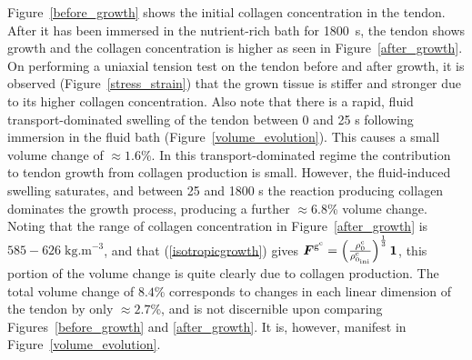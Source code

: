 Figure~\ref{before_growth} shows the initial collagen concentration in
the tendon. After it has been immersed in the nutrient-rich bath for
1800~s, the tendon shows growth and the collagen concentration is
higher as seen in Figure~\ref{after_growth}. On performing a uniaxial
tension test on the tendon before and after growth, it is observed
(Figure~\ref{stress_strain}) that the grown tissue is stiffer and
stronger due to its higher collagen concentration. Also note that
there is a rapid, fluid transport-dominated swelling of the tendon
between 0 and 25 s following immersion in the fluid bath
(Figure~\ref{volume_evolution}). This causes a small volume change of
$\approx 1.6$\%. In this transport-dominated regime the contribution
to tendon growth from collagen production is small. However, the
fluid-induced swelling saturates, and between 25 and 1800 s the
reaction producing collagen dominates the growth process, producing a
further $\approx 6.8$\% volume change. Noting that the range of
collagen concentration in Figure~\ref{after_growth} is $585-626\;
\mbox{kg.m}^{-3}$, and that (\ref{isotropicgrowth}) gives
$\mbox{\boldmath$ F$}^{\mathrm{g}^\mathrm{c}} = \left(
\frac{\rho_0^\mathrm{c}}{\rho_{0_{\mathrm{ini}}}^\mathrm{c}} \right)^
     {\frac{1}{3}} {\bf 1}$, this portion of the volume change is
     quite clearly due to collagen production. The total volume change
     of $8.4$\% corresponds to changes in each linear dimension of the
     tendon by only $\approx 2.7$\%, and is not discernible upon
     comparing Figures~\ref{before_growth} and \ref{after_growth}. It
     is, however, manifest in Figure~\ref{volume_evolution}.


